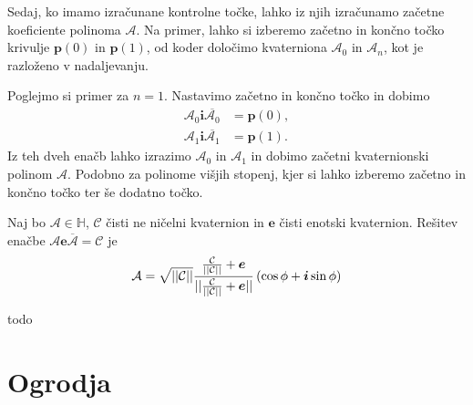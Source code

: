 \documentclass[mat1]{fmfdelo}
\newcommand{\HH}{\mathbb H}
\newcommand{\ii}{\boldsymbol i}
\newcommand{\pp}{\boldsymbol p}
\newcommand{\e}{\boldsymbol e}
\newcommand{\A}{\mathcal A}
\newcommand{\CC}{\mathcal C}
\begin{document}
\iffalse
Z višanjem stopnje začetnega polinoma, dobimo več prostih parametrov, kar lahko izkoristimo pri konstrukciji krivulje. Več o tem kasneje.
\fi
Sedaj, ko imamo izračunane kontrolne točke, lahko iz njih izračunamo začetne koeficiente polinoma $\A$. Na primer, lahko si izberemo začetno in končno točko krivulje $\pp(0)$ in $\pp(1)$, od koder določimo kvaterniona $\A_0$ in  $\A_n$, kot je razloženo v nadaljevanju.
\begin{primer}Poglejmo si primer za	$n=1$. Nastavimo začetno in končno točko in dobimo
	\begin{equation*}
	\begin{split}
		\A_0\ii\overline{\A_0} &= \pp(0), \\
		\A_1\ii\overline{\A_1} &= \pp(1).
	\end{split}
\end{equation*}
Iz teh dveh enačb lahko izrazimo $\A_0$ in $\A_1$ in dobimo začetni kvaternionski polinom $\A$. Podobno za polinome višjih stopenj, kjer si lahko izberemo začetno in končno točko ter še dodatno točko.	
\end{primer}

\begin{trditev}
	Naj bo $\A \in \HH$, $\CC$ čisti ne ničelni kvaternion in $\e$ čisti enotski kvaternion. Rešitev enačbe $\A \e \overline{\A} = \CC$ je
	\begin{equation}{\label{kvat_resitev}}
		\A = \sqrt{||\CC||} \frac{\frac{\CC}{||\CC||} + \e}{||\frac{\CC}{||\CC||} + \e||}\left(\cos \phi + \ii \sin \phi \right)
	\end{equation}
\end{trditev}
\begin{dokaz}
	todo
\end{dokaz}
\section{Ogrodja}
\end{document}
